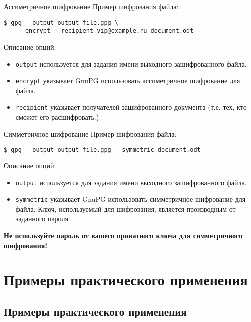 \documentclass[presentation]{beamer}
\begin{document}
\begin{frame}[fragile]{Ассиметричное шифрование}
  Пример шифрования файла:
  \begin{verbatim}
$ gpg --output output-file.gpg \
    --encrypt --recipient vip@example.ru document.odt
  \end{verbatim}

  \vspace{5 mm}

  Описание опций:
  \begin{itemize}
  \item \texttt{output} используется для задания имени выходного
    зашифрованного файла.
  \item \texttt{encrypt} указывает GnuPG использовать ассиметричное
    шифрование для файла.
  \item \texttt{recipient} указывает получателей зашифрованного
    документа (т.е. тех, кто сможет его расшифровать.)
  \end{itemize}
\end{frame}

\begin{frame}[fragile]{Симметричное шифрование}
  Пример шифрования файла:
  \begin{verbatim}
$ gpg --output output-file.gpg --symmetric document.odt
  \end{verbatim}

  \vspace{2.5 mm}

  Описание опций:
  \begin{itemize}
  \item \texttt{output} используется для задания имени выходного
    зашифрованного файла.
  \item \texttt{symmetric} указывает GnuPG использовать симметричное
    шифрование для файла.  Ключ, используемый для шифрования, является
    производным от заданного пароля.
  \end{itemize}

  \vspace{2.5 mm}

  \textbf{Не используйте пароль от вашего приватного ключа для
    симметричного шифрования!}
\end{frame}



\section{Примеры практического применения}

\subsection{Примеры практического применения}
\end{document}
